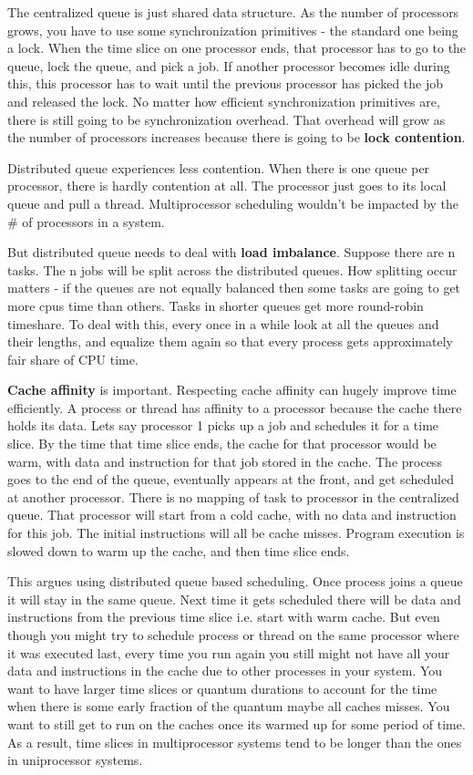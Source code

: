 \documentclass[twoside]{article}
\begin{document}
The centralized queue is just shared data structure. As the number of processors grows, you have to use some synchronization primitives - the standard one being a lock. When the time slice on one processor ends, that processor has to go to the queue, lock the queue, and pick a job. If another processor becomes idle during this, this processor has to wait until the previous processor has picked the job and released the lock. No matter how efficient synchronization primitives are, there is still going to be synchronization overhead. That overhead will grow as the number of processors increases because there is going to be \textbf{lock contention}.

Distributed queue experiences less contention. When there is one queue per processor, there is hardly contention at all. The processor just goes to its local queue and pull a thread. Multiprocessor scheduling wouldn't be impacted by the \# of processors in a system.

But distributed queue needs to deal with \textbf{load imbalance}. Suppose there are n tasks. The n jobs will be split across the distributed queues. How splitting occur matters - if the queues are not equally balanced then some tasks are going to get more cpus time than others. Tasks in shorter queues get more round-robin timeshare. To deal with this, every once in a while look at all the queues and their lengths, and equalize them again so that every process gets approximately fair share of CPU time.

\textbf{Cache affinity} is important. Respecting cache affinity can hugely improve time efficiently. A process or thread has affinity to a processor because the cache there holds its data. Let\textsc{}s say processor 1 picks up a job and schedules it for a time slice. By the time that time slice ends, the cache for that processor would be warm, with data and instruction for that job stored in the cache. The process goes to the end of the queue, eventually appears at the front, and get scheduled at another processor. There is no mapping of task to processor in the centralized queue. That processor will start from a cold cache, with no data and instruction for this job. The initial instructions will all be cache misses. Program execution is slowed down to warm up the cache, and then time slice ends.  

This argues using distributed queue based scheduling. Once process joins a queue it will stay in the same queue. Next time it gets scheduled there will be data and instructions from the previous time slice i.e. start with warm cache. But even though you might try to schedule process or thread on the same processor where it was executed last, every time you run again you still might not have all your data and instructions in the cache due to other processes in your system. You want to have larger time slices or quantum durations to account for the time when there is some early fraction of the quantum maybe all caches misses. You want to still get to run on the caches once it\textsc{}s warmed up for some period of time. As a result, time slices in multiprocessor systems tend to be longer than the ones in uniprocessor systems. 
\end{document}
